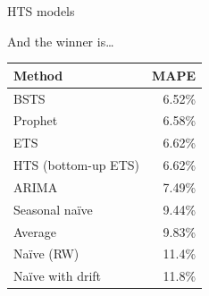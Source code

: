 \documentclass[12pt,aspectratio=169]{beamer}
\begin{document}
\begin{frame}{HTS models}
\end{frame}

\begin{frame}{And the winner is\ldots}
    \centering%
    \begin{tabular}{lr}
        \toprule
        \textbf{Method} & \textbf{MAPE} \\
        \midrule
        BSTS                     & 6.52\% \\
        Prophet                  & 6.58\% \\
        ETS                      & 6.62\% \\
        HTS (bottom\hyp{}up ETS) & 6.62\% \\
        ARIMA                    & 7.49\% \\
        Seasonal naïve           & 9.44\% \\
        Average                  & 9.83\% \\
        Naïve (RW)               & 11.4\% \\
        Naïve with drift         & 11.8\% \\
        \bottomrule
    \end{tabular}
\end{frame}
\end{document}
